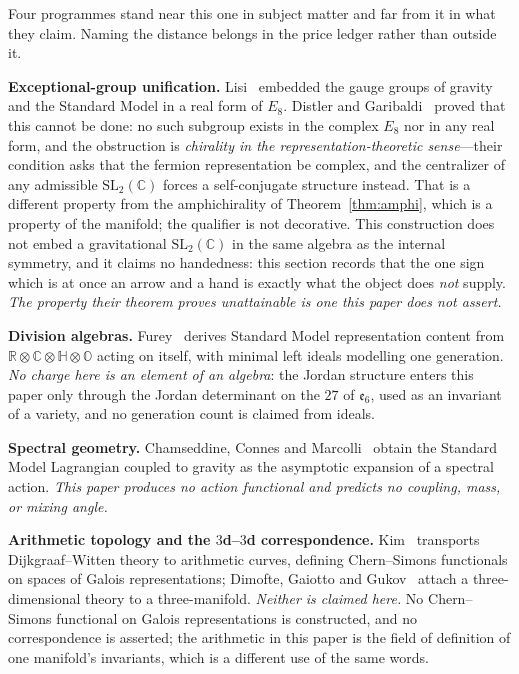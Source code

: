\documentclass[11pt,reqno]{amsart}
\theoremstyle{plain}
\theoremstyle{definition}
\theoremstyle{remark}
\newcommand{\C}{\mathbb{C}}
\newcommand{\R}{\mathbb{R}}
\newcommand{\SL}{\mathrm{SL}}
\newcommand{\ee}{\mathfrak{e}}
\begin{document}
Four programmes stand near this one in subject matter and far from it in what they claim.
Naming the distance belongs in the price ledger rather than outside it.

\textbf{Exceptional-group unification.} Lisi~\cite{Lisi} embedded the gauge groups of
gravity and the Standard Model in a real form of $E_8$. Distler and
Garibaldi~\cite{DistlerGaribaldi} proved that this cannot be done: no such subgroup exists
in the complex $E_8$ nor in any real form, and the obstruction is \emph{chirality in the
representation-theoretic sense}---their condition asks that the fermion representation be
complex, and the centralizer of any admissible $\SL_2(\C)$ forces a self-conjugate structure
instead. That is a different property from the amphichirality of Theorem~\ref{thm:amphi},
which is a property of the manifold; the qualifier is not decorative. This construction does
not embed a gravitational $\SL_2(\C)$ in the same algebra as the internal symmetry, and it
claims no handedness: this section records that the one sign which is at once an arrow and a
hand is exactly what the object does \emph{not} supply. \emph{The property their theorem
proves unattainable is one this paper does not assert.}

\textbf{Division algebras.} Furey~\cite{Furey} derives Standard Model representation
content from $\R\otimes\C\otimes\mathbb{H}\otimes\mathbb{O}$ acting on itself, with minimal
left ideals modelling one generation. \emph{No charge here is an element of an algebra}: the
Jordan structure enters this paper only through the Jordan determinant on the $27$ of
$\ee_6$, used as an invariant of a variety, and no generation count is claimed from ideals.

\textbf{Spectral geometry.} Chamseddine, Connes and Marcolli~\cite{CCM} obtain the Standard
Model Lagrangian coupled to gravity as the asymptotic expansion of a spectral action.
\emph{This paper produces no action functional and predicts no coupling, mass, or mixing
angle.}

\textbf{Arithmetic topology and the $3$d--$3$d correspondence.} Kim~\cite{Kim} transports
Dijkgraaf--Witten theory to arithmetic curves, defining Chern--Simons functionals on spaces of
Galois representations; Dimofte, Gaiotto and Gukov~\cite{DGG} attach a three-dimensional
theory to a three-manifold. \emph{Neither is claimed here.} No Chern--Simons functional on
Galois representations is constructed, and no correspondence is asserted; the arithmetic in
this paper is the field of definition of one manifold's invariants, which is a different use of
the same words.
\end{document}
